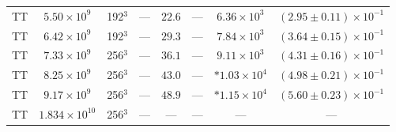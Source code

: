 \documentclass[aps, pre, onecolumn, nofootinbib, notitlepage, groupedaddress, amsfonts, amssymb, amsmath, longbibliography, superscriptaddress]{revtex4-1}
\begin{document}
\begin{table}[ht]
\begin{center}
\begin{tabularx}{\textwidth}{c c c c c c c c}
TT	&	$5.50 \times 10^9$		&	192$^3$				&	---					&	$22.6$			&	---		&	$6.36 \times 10^3$  & $(2.95 \pm 0.11) \times 10^{-1}$ \\
TT	&	$6.42 \times 10^9$		&	192$^3$				&	---					&	$29.3$			&	---		&	$7.84 \times 10^3$  & $(3.64 \pm 0.15) \times 10^{-1}$ \\
TT	&	$7.33 \times 10^9$		&	256$^3$				&	---					&	$36.1$			&	---		&	$9.11 \times 10^3$  & $(4.31 \pm 0.16) \times 10^{-1}$ \\
TT	&	$8.25 \times 10^9$		&	256$^3$				&	---					&	$43.0$			&	---		&	$*1.03 \times 10^4$ & $(4.98 \pm 0.21) \times 10^{-1}$ \\
TT	&	$9.17 \times 10^9$		&	256$^3$				&	---					&	$48.9$			&	---		&	$*1.15 \times 10^4$ & $(5.60 \pm 0.23) \times 10^{-1}$ \\
TT	&	$1.834 \times 10^{10}$	&	256$^3$				&	---					&	---				&	---		&	--- & --- \\
\hline																	
\end{tabularx}
\end{center}
\end{table}
\end{document}
